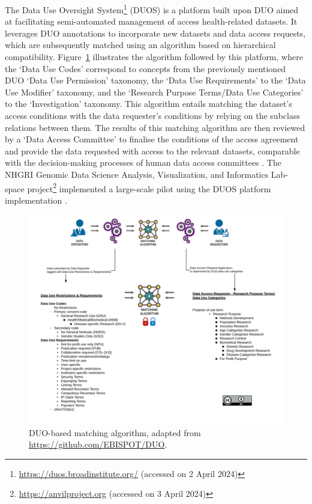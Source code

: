 The Data Use Oversight System\footnote{\url{https://duos.broadinstitute.org/} (accessed on 2 April 2024)} (DUOS) is a platform built upon DUO aimed at facilitating semi-automated management of access health-related datasets.
It leverages DUO annotations to incorporate new datasets and data access requests, which are subsequently matched using an algorithm based on hierarchical compatibility.
Figure~\ref{fig:duo-matching} illustrates the algorithm followed by this platform, where the `Data Use Codes' correspond to concepts from the previously mentioned DUO `Data Use Permission' taxonomy,  the `Data Use Requirements' to the `Data Use Modifier' taxonomy, and the `Research Purpose Terms/Data Use Categories' to the `Investigation' taxonomy.
This algorithm entails matching the dataset's access conditions with the data requester's conditions by relying on the subclass relations between them.
The results of this matching algorithm are then reviewed by a `Data Access Committee' to finalise the conditions of the access agreement and provide the data requested with access to the relevant datasets, comparable with the decision-making processes of human data access committees \citep{cabili_empirical_2021}.
The NHGRI Genomic Data Science Analysis, Visualization, and Informatics Lab-space project\footnote{\url{https://anvilproject.org} (accessed on 3 April 2024)} implemented a large-scale pilot using the DUOS platform implementation \citep{schatz_inverting_2022}.

\begin{figure}[ht]
    \centering
    \includegraphics[width=1\linewidth]{figures//chapter-6/DUO-matching-with-license.png}
    \caption{DUO-based matching algorithm, adapted from \url{https://github.com/EBISPOT/DUO}.}
    \label{fig:duo-matching}
\end{figure}


